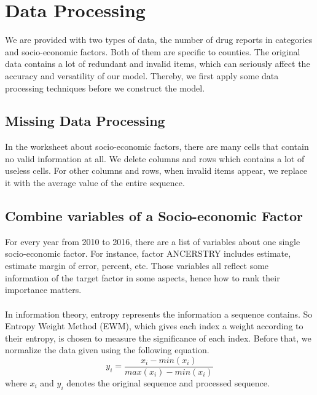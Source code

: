 \documentclass[12pt]{article}
\newcommand{\upcite}[1]{\textsuperscript{\textsuperscript{\cite{#1}}}}
\begin{document}
\section{Data Processing}
We are provided with two types of data, the number of drug reports in categories and socio-economic factors. Both of them are specific to counties. The original data contains a lot of redundant and invalid items, which can seriously affect the accuracy and versatility of our model. Thereby, we first apply some data processing techniques before we construct the model.

\subsection{Missing Data Processing}
In the worksheet about socio-economic factors, there are many cells that contain no valid information at all. We delete columns and rows which contains a lot of useless cells. For other columns and rows, when invalid items appear, we replace it with the average value of the entire sequence.

\subsection{Combine variables of a Socio-economic Factor}
For every year from 2010 to 2016, there are a list of variables about one single socio-economic factor. For instance, factor ANCERSTRY includes estimate, estimate margin of error, percent, etc. Those variables all reflect some information of the target factor in some aspects, hence how to rank their importance matters. 

In information theory, entropy represents the information a sequence contains\upcite{3}. So Entropy Weight Method (EWM), which gives each index a weight according to their entropy, is chosen to measure the significance of each index. Before that, we normalize the data given using the following equation.
\begin{equation}
	y_{i} = \frac{x_{i}-min(x_{i})}{max(x_{i}) - min(x_{i})}
\end{equation}
where $x_{i}$ and $y_{i}$ denotes the original sequence and processed sequence.
\end{document}
